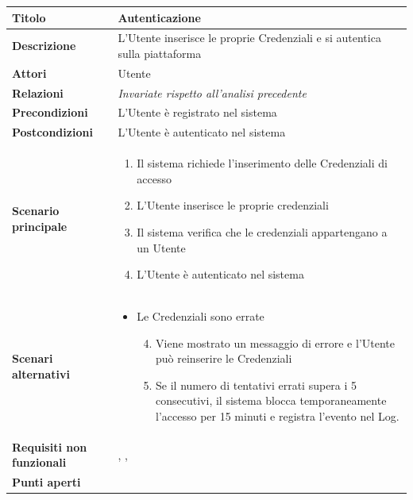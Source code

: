 \documentclass[12pt,a4paper]{report}
\let\oldhyperref\hyperref
\renewcommand{\hyperref}[2][]{\oldhyperref[#1]{\dotuline{#2}}}
\begin{document}
\begin{tabularx}{\textwidth}{|p{3.8cm}|X|}
    \hline
    \rowcolor{studyColor} \textbf{Titolo} & \textbf{Autenticazione} \\ \hline
    \endhead
    \textbf{Descrizione} & L'Utente inserisce le proprie Credenziali e si autentica sulla piattaforma \\ \hline
    \textbf{Attori} & Utente \\ \hline
    \textbf{Relazioni} & \textit{Invariate rispetto all'analisi precedente} \\ \hline
    \textbf{Precondizioni} & L'Utente è registrato nel sistema \\ \hline
    \textbf{Postcondizioni} & L'Utente è autenticato nel sistema \\ \hline
    \textbf{Scenario principale} & 
        \begin{enumerate}[nosep, leftmargin=*, before={\vspace{-0.5\baselineskip}}, after={\vspace{-0.8\baselineskip}}]
            \item Il sistema richiede l'inserimento delle Credenziali di accesso
            \item L'Utente inserisce le proprie credenziali
            \item Il sistema verifica che le credenziali appartengano a un Utente
            \item L'Utente è autenticato nel sistema
        \end{enumerate} \\ \hline
    \textbf{Scenari alternativi} & 
        \begin{itemize}[nosep, leftmargin=*, before={\vspace{-0.5\baselineskip}}, after={\vspace{-0.8\baselineskip}}]
            \item Le Credenziali sono errate
            \begin{enumerate}[nosep, leftmargin=*]
                \setcounter{enumi}{3}
                \item Viene mostrato un messaggio di errore e l'Utente può reinserire le Credenziali
                \item Se il numero di tentativi errati supera i 5 consecutivi, il sistema blocca temporaneamente l'accesso per 15 minuti e registra l'evento nel Log.
            \end{enumerate}
        \end{itemize} \\ \hline
    \textbf{Requisiti non funzionali} & \hyperref[R02N]{R02N}, \hyperref[R11N]{R11N}, \hyperref[R12N]{R12N} \\ \hline
    \textbf{Punti aperti} & \\ \hline
\end{tabularx}
\end{document}
